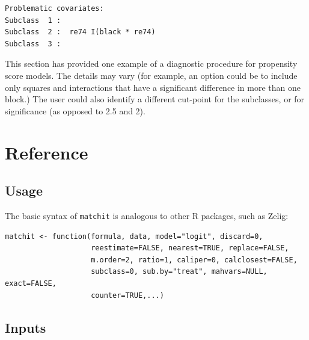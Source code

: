 \documentclass[oneside,letterpaper,titlepage]{article}
\begin{document}
\begin{verbatim}
Problematic covariates:
Subclass  1 :  
Subclass  2 :  re74 I(black * re74)
Subclass  3 :  
\end{verbatim}

This section has provided one example of a diagnostic procedure for
propensity score models.  The details may vary (for example, an option
could be to include only squares and interactions that have a
significant difference in more than one block.)  The user could also
identify a different cut-point for the subclasses, or for significance
(as opposed to 2.5 and 2).

\section{Reference}

\subsection{Usage}

The basic syntax of \texttt{matchit} is analogous to other R packages,
such as Zelig:

\begin{verbatim}
matchit <- function(formula, data, model="logit", discard=0,
                    reestimate=FALSE, nearest=TRUE, replace=FALSE,
                    m.order=2, ratio=1, caliper=0, calclosest=FALSE,
                    subclass=0, sub.by="treat", mahvars=NULL, exact=FALSE,
                    counter=TRUE,...)
\end{verbatim}

\subsection{Inputs}
\end{document}
